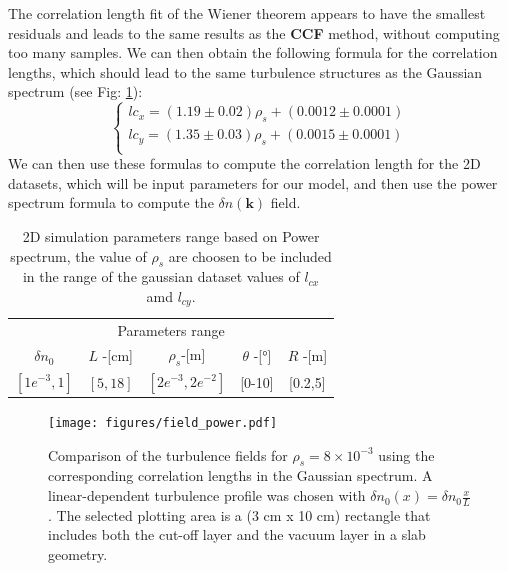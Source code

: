 \documentclass[11pt,openany]{report}
\begin{document}
\begin{multicols}{2}
    The correlation length fit of the Wiener theorem appears to have the smallest residuals and leads to the same results as the \textbf{CCF} method, without computing too many samples. We can then obtain the following formula for the correlation lengths, which should lead to the same turbulence structures as the Gaussian spectrum (see Fig: \ref{fig:density_field}):
    \begin{equation*}
        \begin{cases}
            lc_x = (1.19 \pm 0.02) \rho_s + (0.0012 \pm 0.0001) \\
            lc_y = (1.35 \pm 0.03) \rho_s + (0.0015 \pm 0.0001) \\
        \end{cases}
        \label{eq:}
    \end{equation*}
    We can then use these formulas to compute the correlation length for the 2D datasets, which will be input parameters for our model, and then use the power spectrum formula to compute the $\delta n(\textbf{k} )$ field.

    \setlength{\tabcolsep}{.02\linewidth}

    \begin{table}[H]
        \begin{tabular}{ccccc}
            \toprule
            \multicolumn{5}{c}{Parameters range}                                         \\
            \cmidrule{1 -5}
            $\delta n_0$   & $L$ -[cm] & $\rho_s$-[m]         & $\theta$ -[°] & $R$ -[m] \\
            \midrule
            $[1e^{-3}, 1]$ & $[5,18]$  & $[2e^{-3}, 2e^{-2}]$ & [0-10]        & [0.2,5]  \\
            \bottomrule
        \end{tabular}
        \caption{2D simulation parameters range based on Power spectrum, the value of $\rho_s$ are choosen to be included in the range of the gaussian dataset values of $l_{cx}$ amd $l_{cy}$. }
        \label{Power_table}
    \end{table}


    \begin{figure}[H]
        \centering
        \texttt{[image: figures/field\_power.pdf]}
        \caption{Comparison of the turbulence fields for $\rho_s = 8 \times 10^{-3}$ using the corresponding correlation lengths in the Gaussian spectrum. A linear-dependent turbulence profile was chosen with $\delta n_0(x) = \delta n_0 \frac{x}{L}$. The selected plotting area is a (3 cm x 10 cm) rectangle that includes both the cut-off layer and the vacuum layer in a slab geometry.}
        \label{fig:density_field}
    \end{figure}


\end{multicols}
\end{document}

